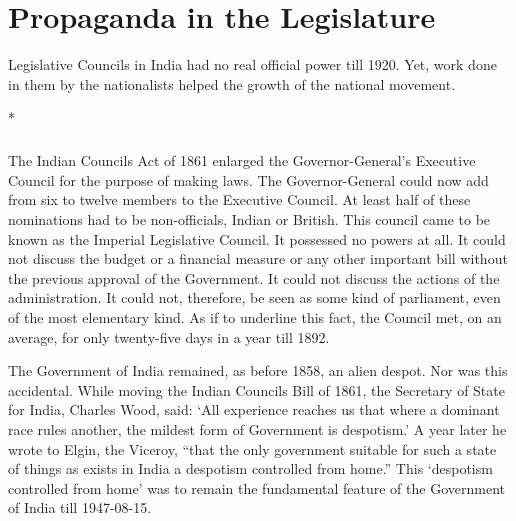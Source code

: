 \chapter{Propaganda in the Legislature}
\begin{multicols}{2}

Legislative Councils in India had no real official power till 1920. Yet, work done in them by the nationalists helped the growth of the national movement.

\begin{center}*\end{center}

\paragraph*{}
The Indian Councils Act of 1861 enlarged the Governor-General's Executive Council for the purpose of making laws. The Governor-General could now add from six to twelve members to the Executive Council. At least half of these nominations had to be non-officials, Indian or British. This council came to be known as the Imperial Legislative Council. It possessed no powers at all. It could not discuss the budget or a financial measure or any other important bill without the previous approval of the Government. It could not discuss the actions of the administration. It could not, therefore, be seen as some kind of parliament, even of the most elementary kind. As if to underline this fact, the Council met, on an average, for only twenty-five days in a year till 1892.

The Government of India remained, as before 1858, an alien despot. Nor was this accidental. While moving the Indian Councils Bill of 1861, the Secretary of State for India, Charles Wood, said: `All experience reaches us that where a dominant race rules another, the mildest form of Government is despotism.' A year later he wrote to Elgin, the Viceroy, ``that the only government suitable for such a state of things as exists in India a despotism controlled from home.'' This `despotism controlled from home' was to remain the fundamental feature of the Government of India till 1947-08-15.


\end{multicols}
